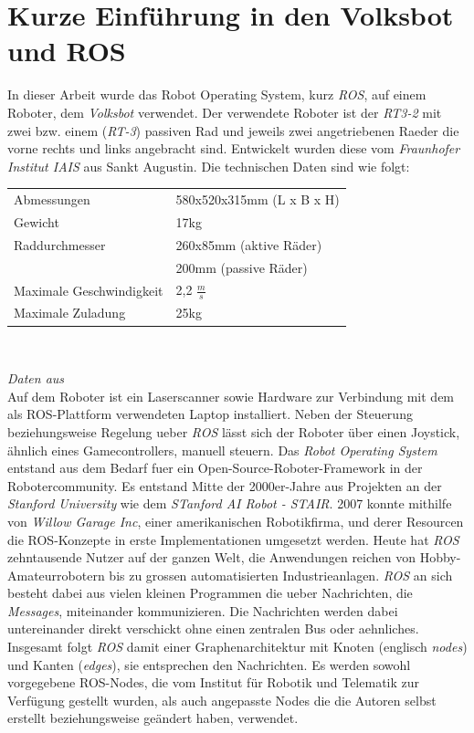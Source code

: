 \documentclass[11pt,a4paper]{article}
\begin{document}
\section{Kurze Einführung in den Volksbot und ROS}
In dieser Arbeit wurde das Robot Operating System, kurz \textit{ROS}, auf einem Roboter, dem \textit{Volksbot} verwendet.
Der verwendete Roboter ist der \textit{RT3-2} mit zwei bzw. einem (\textit{RT-3}) passiven Rad und jeweils zwei angetriebenen Raeder die vorne rechts und links angebracht sind.
Entwickelt wurden diese vom \textit{Fraunhofer Institut IAIS} aus Sankt Augustin. 
Die technischen Daten sind wie folgt:\\
\vspace{-5mm}
\begin{center}
\begin{tabular}{| p{5cm} p{5cm} |}
  \hline
  Abmessungen & 580x520x315mm (L x B x H) \\
  Gewicht & 17kg \\
  
  Raddurchmesser & 260x85mm (aktive Räder) \\
   & 200mm (passive Räder) \\
  Maximale Geschwindigkeit & 2,2 $\frac{m}{s}$ \\
  
  Maximale Zuladung & 25kg \\
  \hline
\end{tabular} \\
\end{center}

\textit{Daten aus} \cite{website:volksbot} \\

Auf dem Roboter ist ein Laserscanner sowie Hardware zur Verbindung mit dem als ROS-Plattform verwendeten
Laptop installiert. Neben der Steuerung beziehungsweise Regelung ueber \textit{ROS} lässt sich der Roboter über einen Joystick, ähnlich eines Gamecontrollers, manuell steuern.
Das \textit{Robot Operating System}  entstand aus dem Bedarf fuer ein Open-Source-Roboter-Framework in der Robotercommunity.
Es entstand Mitte der 2000er-Jahre aus Projekten an der \textit{Stanford University} wie dem \textit{STanford AI Robot - STAIR}.
2007 konnte mithilfe von \textit{Willow Garage Inc}, einer amerikanischen Robotikfirma, und derer
Resourcen die ROS-Konzepte in erste Implementationen umgesetzt werden. Heute hat \textit{ROS} zehntausende Nutzer auf der ganzen Welt,
die Anwendungen reichen von Hobby-Amateurrobotern bis zu grossen automatisierten Industrieanlagen. 
\textit{ROS} an sich besteht dabei aus vielen kleinen Programmen die ueber Nachrichten, die \textit{Messages}, miteinander kommunizieren.
Die Nachrichten werden dabei untereinander direkt verschickt ohne einen zentralen Bus oder aehnliches. Insgesamt
folgt \textit{ROS} damit einer Graphenarchitektur mit Knoten (englisch \textit{nodes}) und Kanten (\textit{edges}), sie entsprechen den Nachrichten. \cite{quigley2015programming}
Es werden sowohl vorgegebene ROS-Nodes, die vom Institut für Robotik und Telematik zur Verfügung gestellt wurden, als auch angepasste Nodes die die Autoren selbst erstellt beziehungsweise
geändert haben, verwendet. 
\end{document}
